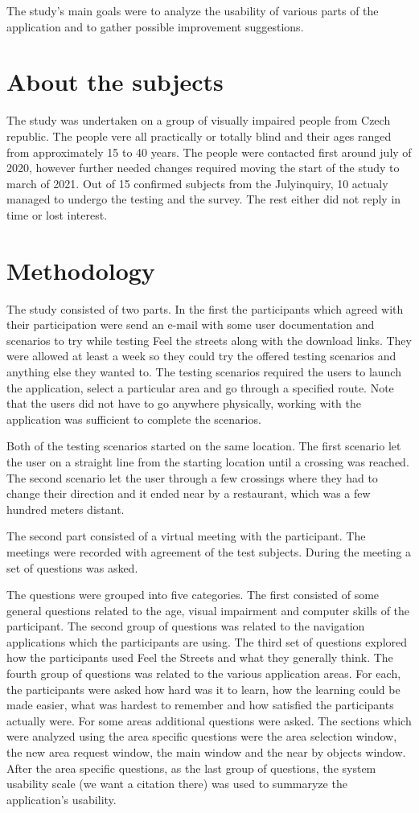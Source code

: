 \documentclass[nolof,digital]{fithesis3}
\begin{document}
The study's main goals were to analyze the usability of various parts of the application and to gather possible improvement suggestions.
\section{About the subjects}
The study was undertaken on a group of visually impaired people from Czech republic. The people vere all practically or totally blind and their ages ranged from approximately 15 to 40 years. The people were contacted first around july of 2020, however further needed changes required moving the start of the study to march of 2021. Out of 15 confirmed subjects from the Julyinquiry, 10 actualy managed to undergo the testing and the survey. The rest either did not reply in time or lost interest.
\section{Methodology}
The study consisted of two parts. In the first the participants which agreed with their participation were send an e-mail with some user documentation and scenarios to try while testing Feel the streets along with the download links. They were allowed at least a week so they could try the offered testing scenarios and anything else they wanted to. The testing scenarios required the users to launch the application, select a particular area and go through a specified route. Note that the users did not have to go anywhere physically, working with the application was sufficient to complete the scenarios.

Both of the testing scenarios started on the same location. The first scenario let the user on a straight line from the starting location until a crossing was reached. The second scenario let the user through a few crossings where they had to change their direction and it ended near by a restaurant, which was a few hundred meters distant.

The second part consisted of a virtual meeting with the participant. The meetings were recorded with agreement of the test subjects. During the meeting a set of questions was asked.

The questions were grouped into five categories. The first consisted of some general questions related to the age, visual impairment and computer skills of the participant. The second group of questions was related to the navigation applications which the participants are using. The third set of questions explored how the participants used Feel the Streets and what they generally think. The fourth group of questions was related to the various application areas. For each, the participants were asked how hard was it to learn, how the learning could be made easier, what was hardest to remember and how satisfied the participants actually were. For some areas additional questions were asked. The sections which were analyzed using the area specific questions were the area selection window, the new area request window, the main window and the near by objects window. After the area specific questions, as the last group of questions, the system usability scale (we want a citation there) was used to summaryze the application's usability.
\end{document}
